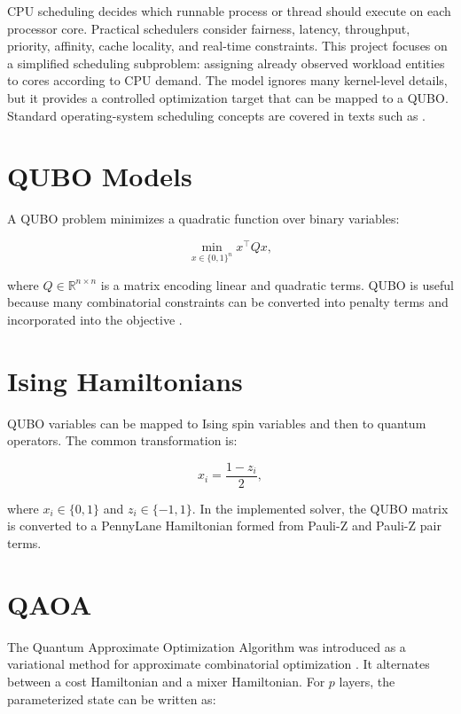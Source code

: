 \documentclass[12pt,a4paper,oneside]{report}
\begin{document}
CPU scheduling decides which runnable process or thread should execute on each
processor core. Practical schedulers consider fairness, latency, throughput,
priority, affinity, cache locality, and real-time constraints. This project
focuses on a simplified scheduling subproblem: assigning already observed
workload entities to cores according to CPU demand. The model ignores many
kernel-level details, but it provides a controlled optimization target that can
be mapped to a QUBO. Standard operating-system scheduling concepts are covered
in texts such as \cite{silberschatz}.

\section{QUBO Models}

A QUBO problem minimizes a quadratic function over binary variables:

\begin{equation}
  \min_{x \in \{0,1\}^n} x^\top Q x ,
\end{equation}

where \(Q \in \mathbb{R}^{n \times n}\) is a matrix encoding linear and
quadratic terms. QUBO is useful because many combinatorial constraints can be
converted into penalty terms and incorporated into the objective
\cite{lucas2014ising,glover2018qubo}.

\section{Ising Hamiltonians}

QUBO variables can be mapped to Ising spin variables and then to quantum
operators. The common transformation is:

\begin{equation}
  x_i = \frac{1 - z_i}{2},
\end{equation}

where \(x_i \in \{0,1\}\) and \(z_i \in \{-1,1\}\). In the implemented solver,
the QUBO matrix is converted to a PennyLane Hamiltonian formed from Pauli-Z and
Pauli-Z pair terms.

\section{QAOA}

The Quantum Approximate Optimization Algorithm was introduced as a variational
method for approximate combinatorial optimization \cite{farhi2014qaoa}. It
alternates between a cost Hamiltonian and a mixer Hamiltonian. For \(p\) layers,
the parameterized state can be written as:
\end{document}
